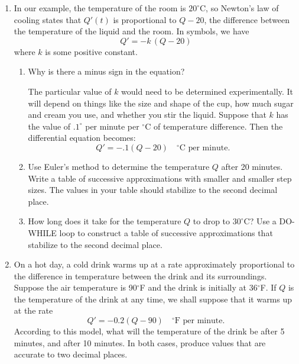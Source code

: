 \begin{enumerate}
\item In our example, the temperature of the room is
\mbox{$20^{\circ}$C}, so Newton's law of cooling states that $Q'(t)$
is proportional to $Q - 20$, the difference between the temperature of
the liquid and the room.  In symbols, we have
	\[
Q' = -k\,(Q -20)
\]
where $k$ is some positive constant.

  \begin{enumerate}
  \item Why is there a minus sign in the equation?



The particular value of $k$ would need to be determined
experimentally.  It will depend on things like the size and shape of
the cup, how much sugar and cream you use, and whether you stir the
liquid.  Suppose that $k$ has the value of \mbox{$.1^{\circ}$} per
minute per \mbox{$^{\circ}$C} of temperature difference. Then the
differential equation becomes:
	\[
Q' = -.1(Q-20) \quad \mbox{$^{\circ}$C per minute}.
\]


  \item \label{ex:coffee1} Use Euler's method to determine the temperature
$Q$ after 20 minutes.  Write a table of successive approximations with
smaller and smaller step sizes.  The values in your table should
stabilize to the second decimal place.

  \item \label{ex:coffee2} How long does it take for the temperature $Q$
to drop to \mbox{$30^{\circ}$C}?  Use a DO-WHILE loop to construct a table of successive approximations that
stabilize to the second decimal place.


\end{enumerate}
\item On a hot day, a cold drink warms up at a rate approximately
proportional to the difference in temperature between the drink and
its surroundings.  Suppose the air temperature is 90$^\circ$F and the
drink is initially at 36$^\circ$F.  If $Q$ is the temperature of the
drink at any time, we shall suppose that it warms up at the rate
	\[
Q' = -0.2(Q - 90) \quad 
			\mbox{$^\circ$F per minute}.
\] 
According to this model, what will the temperature of the drink be
after 5 minutes, and after 10 minutes.\label{ex:cold drink} In both
cases, produce values that are accurate to two decimal places.



\end{enumerate}
